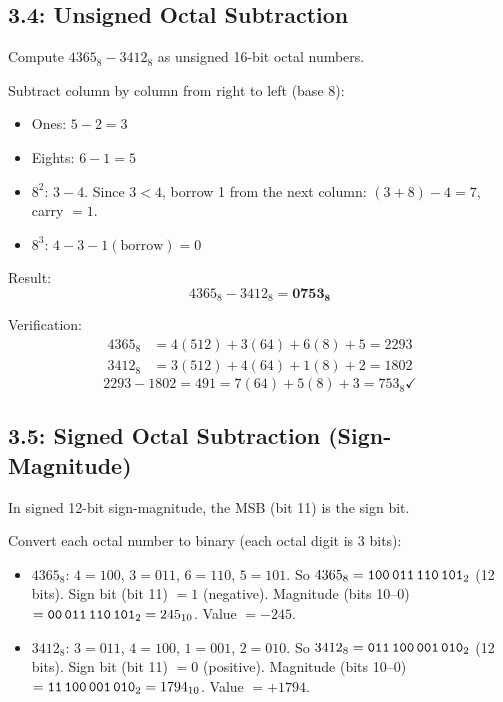 \subsection*{3.4: Unsigned Octal Subtraction}
\hypertarget{sol-3.4}{}

Compute $4365_8 - 3412_8$ as unsigned 16-bit octal numbers.

Subtract column by column from right to left (base 8):
\begin{itemize}
  \item Ones: $5 - 2 = 3$
  \item Eights: $6 - 1 = 5$
  \item $8^2$: $3 - 4$. Since $3 < 4$, borrow 1 from the next column:
        $(3 + 8) - 4 = 7$, carry $= 1$.
  \item $8^3$: $4 - 3 - 1(\text{borrow}) = 0$
\end{itemize}

Result:
\[ 4365_8 - 3412_8 = \mathbf{0753_8} \]

Verification:
\begin{align*}
  4365_8 &= 4(512) + 3(64) + 6(8) + 5 = 2293 \\
  3412_8 &= 3(512) + 4(64) + 1(8) + 2 = 1802
\end{align*}
\[ 2293 - 1802 = 491 = 7(64) + 5(8) + 3 = 753_8 \checkmark \]

\subsection*{3.5: Signed Octal Subtraction (Sign-Magnitude)}
\hypertarget{sol-3.5}{}

In signed 12-bit sign-magnitude, the MSB (bit 11) is the sign bit.

Convert each octal number to binary (each octal digit is 3 bits):
\begin{itemize}
  \item $4365_8$: $4 = 100$, $3 = 011$, $6 = 110$, $5 = 101$.
        So $4365_8 = \texttt{100\,011\,110\,101}_2$ (12 bits).
        Sign bit (bit 11) $= 1$ (negative).
        Magnitude (bits 10--0) $= \texttt{00\,011\,110\,101}_2 = 245_{10}$.
        Value $= -245$.
  \item $3412_8$: $3 = 011$, $4 = 100$, $1 = 001$, $2 = 010$.
        So $3412_8 = \texttt{011\,100\,001\,010}_2$ (12 bits).
        Sign bit (bit 11) $= 0$ (positive).
        Magnitude (bits 10--0) $= \texttt{11\,100\,001\,010}_2 = 1794_{10}$.
        Value $= +1794$.
\end{itemize}


